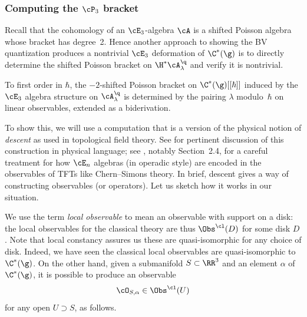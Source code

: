 \documentclass[10pt]{amsart}
\begin{document}
\subsubsection{Computing the $\cP_3$ bracket}

Recall that the cohomology of an $\cE_3$-algebra $\cA$ is a shifted Poisson algebra 
whose bracket has degree~2. 
Hence another approach to showing the BV quantization produces a nontrivial $\cE_3$ deformation of $\C^*(\g)$ is to directly determine the shifted Poisson bracket on $\H^* \cA^\q_\lambda$ and verify it is nontrivial. 

\begin{lmm}
\label{lmm: nontrivial P2 bracket}
To first order in $\hbar$,
the $-2$-shifted Poisson bracket on $\C^*(\g)[[\hbar]]$ induced by
the $\cE_3$ algebra structure on $\cA^\q_\lambda$ is determined by the pairing $\lambda$ modulo~$\hbar$ on linear observables, extended as a biderivation.
\end{lmm}

To show this, we will use a computation that is a version of the physical notion of {\em descent} 
as used in topological field theory. 
See \cite{BBBDN} for pertinent discussion of this construction in physical language;
see \cite{EllSaf}, notably Section~2.4, for a careful treatment for how $\cE_n$ algebras (in operadic style) are encoded in the observables of TFTs like Chern--Simons theory.
In brief, descent gives a way of constructing observables (or operators).
Let us sketch how it works in our situation.

We use the term {\em local observable} to mean an observable with support on a disk:
the local observables for the classical theory are thus $\Obs^\cl(D)$ for some disk $D$.
Note that local constancy assures us these are quasi-isomorphic for any choice of disk.
Indeed, we have seen the classical local observables are quasi-isomorphic to~$\C^*(\g)$.
On the other hand, given a submanifold $S \subset \RR^3$ and an element $\alpha$ of $\C^*(\g)$,
it is possible to produce an observable 
\[
\cO_{S,\alpha} \in \Obs^\cl(U)
\]
for any open $U \supset S$, as follows.
\end{document}
